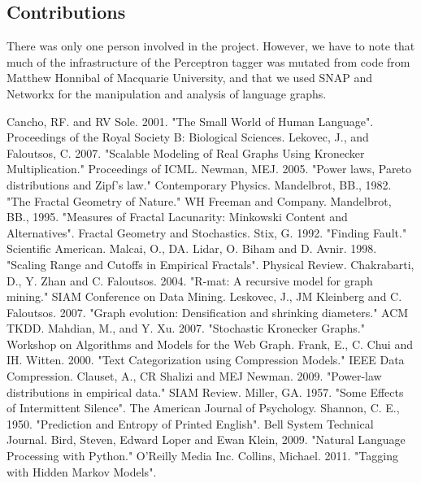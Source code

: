 \documentclass[12pt]{article}
\begin{document}
\subsection*{Contributions}
There was only one person involved in the project. However, we have to note that much of the infrastructure of the Perceptron tagger was mutated from code from Matthew Honnibal of Macquarie University, and that we used SNAP and Networkx for the manipulation and analysis of language graphs. %


\begin{thebibliography}{99}
    Cancho, RF. and RV Sole. 2001. "The Small World of Human Language". Proceedings of the Royal Society B: Biological Sciences.
    Lekovec, J., and Faloutsos, C. 2007. "Scalable Modeling of Real Graphs Using Kronecker Multiplication." Proceedings of ICML.
    Newman, MEJ. 2005. "Power laws, Pareto distributions and Zipf's law." Contemporary Physics.
    Mandelbrot, BB., 1982. "The Fractal Geometry of Nature." WH Freeman and Company.
    Mandelbrot, BB., 1995. "Measures of Fractal Lacunarity: Minkowski Content and Alternatives". Fractal Geometry and Stochastics.
    Stix, G. 1992. "Finding Fault." Scientific American.
    Malcai, O., DA. Lidar, O. Biham and D. Avnir. 1998. "Scaling Range and Cutoffs in Empirical Fractals". Physical Review.
    Chakrabarti, D., Y. Zhan and C. Faloutsos. 2004. "R-mat: A recursive model for graph mining." SIAM Conference on Data Mining.
    Leskovec, J., JM Kleinberg and C. Faloutsos. 2007. "Graph evolution: Densification and shrinking diameters." ACM TKDD.
    Mahdian, M., and Y. Xu. 2007. "Stochastic Kronecker Graphs." Workshop on Algorithms and Models for the Web Graph.
    Frank, E., C. Chui and IH. Witten. 2000. "Text Categorization using Compression Models." IEEE Data Compression.
    Clauset, A., CR Shalizi and MEJ Newman. 2009. "Power-law distributions in empirical data." SIAM Review.
    Miller, GA. 1957. "Some Effects of Intermittent Silence". The American Journal of Psychology.
    Shannon, C. E., 1950. "Prediction and Entropy of Printed English". Bell System Technical Journal.
    Bird, Steven, Edward Loper and Ewan Klein, 2009. "Natural Language Processing with Python." O'Reilly Media Inc.
    Collins, Michael. 2011. "Tagging with Hidden Markov Models".
\end{thebibliography}
\end{document}
